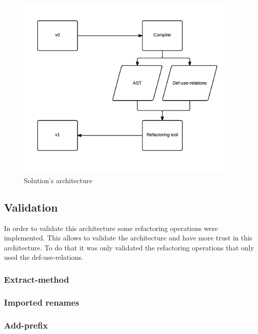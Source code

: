 \begin{figure}[htbp]
	\centering
	\includegraphics[width=0.95\textwidth]{img/arquitectura.png}
	\caption{Solution's architecture}
	\label{fig:label}
\end{figure}

\subsection{Validation}
In order to validate this architecture some refactoring operations were implemented. 
This allows to validate the architecture and have more trust in this architecture.
To do that it was only validated the refactoring operations that only used the def-use-relations.

\subsubsection{Extract-method}
\subsubsection{Imported renames}
\subsubsection{Add-prefix}

